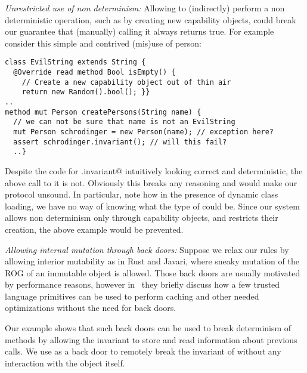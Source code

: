 \textit{Unrestricted use of non determinism:} Allowing \Q@invariant@ to (indirectly) perform a non deterministic operation, such as by creating new capability objects, could break our guarantee that (manually) calling it always returns true.
For example consider this simple and contrived (mis)use of person:
\begin{lstlisting}[morekeywords={assert}]
class EvilString extends String {
  @Override read method Bool isEmpty() {
    // Create a new capability object out of thin air
    return new Random().bool(); }}
..
method mut Person createPersons(String name) {
  // we can not be sure that name is not an EvilString
  mut Person schrodinger = new Person(name); // exception here?
  assert schrodinger.invariant(); // will this fail?
  ..}
\end{lstlisting}
Despite the code for \Q@Person.invariant@ intuitively looking correct and deterministic, the above call to it is not. Obviously this breaks any reasoning and would make our protocol unsound. 
In particular, note how in the presence of dynamic class loading, we have no way of knowing what the type of \Q@name@ could be. Since our system allows non determinism only through capability objects, and 
restricts their creation, the above example would be prevented.

\textit{Allowing internal mutation through back doors:}
Suppose we relax our rules by allowing interior mutability
as in Rust and Javari, where sneaky mutation
of the ROG of an immutable object is allowed.
Those back doors are usually motivated by performance reasons, however in~\cite{GordonEtAl12} they
briefly discuss how a few trusted language primitives can be used to perform caching and other needed optimizations
without the need for back doors.

Our example shows that such back doors can be used to break determinism of  \Q@invariant@ methods by allowing the invariant to store and read information about previous calls. We use \Q@MagicCounter@ as a back door to remotely break the invariant of \Q@person@ without any interaction with the \Q@person@ object itself.


